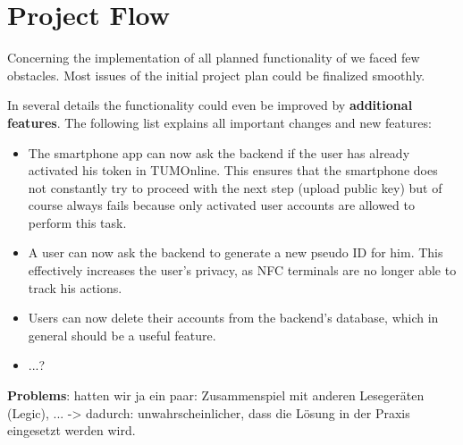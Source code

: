 \section{Project Flow}\label{sec:project_flow}

Concerning the implementation of all planned functionality of \app we faced few obstacles.
Most issues of the initial project plan could be finalized smoothly.

In several details the functionality could even be improved by \textbf{additional features}.
The following list explains all important changes and new features:
\begin{itemize}
\item The smartphone app can now ask the backend if the user has already activated his token in TUMOnline.
This ensures that the smartphone does not constantly try to proceed with the next step (upload public key) but of course always fails because only activated user accounts are allowed to perform this task.
\item A user can now ask the backend to generate a new pseudo ID for him.
This effectively increases the user's privacy, as NFC terminals are no longer able to track his actions.
\item Users can now delete their accounts from the backend's database, which in general should be a useful feature.
\item ...?
\end{itemize}

\bigskip



\textbf{Problems}:
hatten wir ja ein paar: Zusammenspiel mit anderen Lesegeräten (Legic), ...
-> dadurch: unwahrscheinlicher, dass die Lösung in der Praxis eingesetzt werden wird.


\iffalse
any problems? Differences to the planned functionality?

Differences to the planned functionality:
gibt's bei uns eher nicht, oder?

Stefan: Ne, eigentlich sogar noch mehr Funktionalität und erhöhte Sicherheit/Anonymität als spezifiziert.
\fi